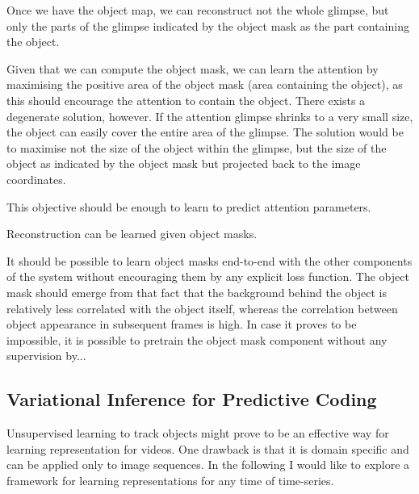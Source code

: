    Once we have the object map, we can reconstruct not the whole glimpse, but only the parts of the glimpse indicated by the object mask as the part containing the object.
    
    Given that we can compute the object mask, we can learn the attention by maximising the positive area of the object mask (area containing the object), as this should encourage the attention to contain the object. There exists a degenerate solution, however. If the attention glimpse shrinks to a very small size, the object can easily cover the entire area of the glimpse. The solution would be to maximise not the size of the object within the glimpse, but the size of the object as indicated by the object mask but projected back to the image coordinates.
    
    This objective should be enough to learn to predict attention parameters.
    
    Reconstruction can be learned given object masks.
    
    It should be possible to learn object masks end-to-end with the other components of the system without encouraging them by any explicit loss function. The object mask should emerge from that fact that the background behind the object is relatively less correlated with the object itself, whereas the correlation between object appearance in subsequent frames is high. In case it proves to be impossible, it is possible to pretrain the object mask component without any supervision by...


\subsection{Variational Inference for Predictive Coding}
\label{sec:pred}

    Unsupervised learning to track objects might prove to be an effective way for learning representation for videos. One drawback is that it is domain specific and can be applied only to image sequences. In the following I would like to explore a framework for learning representations for any time of time-series. 
    
